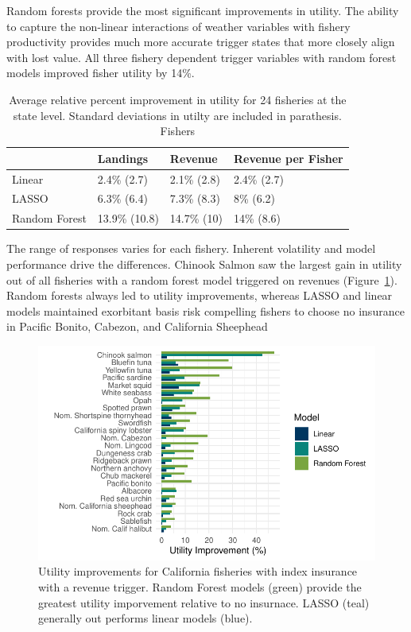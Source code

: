\documentclass[
  letterpaper,
  DIV=11,
  numbers=noendperiod]{scrartcl}
\begin{document}
Random forests provide the most significant improvements in utility. The
ability to capture the non-linear interactions of weather variables with
fishery productivity provides much more accurate trigger states that
more closely align with lost value. All three fishery dependent trigger
variables with random forest models improved fisher utility by 14\%.

\hypertarget{tbl-utility-state}{}
\begin{table}
\caption{\label{tbl-utility-state}Average relative percent improvement in utility for 24 fisheries at the
state level. Standard deviations in utilty are included in parathesis.
Fishers }\tabularnewline

\centering
\begin{tabular}{llll}
\toprule
 & Landings & Revenue & Revenue per Fisher\\
\midrule
Linear & 2.4\%
(2.7) & 2.1\%
(2.8) & 2.4\%
(2.7)\\
LASSO & 6.3\%
(6.4) & 7.3\%
(8.3) & 8\%
(6.2)\\
Random Forest & 13.9\%
(10.8) & 14.7\%
(10) & 14\%
(8.6)\\
\bottomrule
\end{tabular}
\end{table}

The range of responses varies for each fishery. Inherent volatility and
model performance drive the differences. Chinook Salmon saw the largest
gain in utility out of all fisheries with a random forest model
triggered on revenues (Figure~\ref{fig-cali-rev}). Random forests always
led to utility improvements, whereas LASSO and linear models maintained
exorbitant basis risk compelling fishers to choose no insurance in
Pacific Bonito, Cabezon, and California Sheephead

\begin{figure}

{\centering \includegraphics{ibi-ml_files/figure-pdf/fig-cali-rev-1.pdf}

}

\caption{\label{fig-cali-rev}Utility improvements for California
fisheries with index insurance with a revenue trigger. Random Forest
models (green) provide the greatest utility imporvement relative to no
insurnace. LASSO (teal) generally out performs linear models (blue).}

\end{figure}
\end{document}
